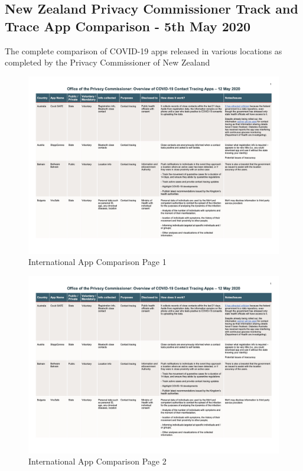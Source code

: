 \documentclass{scrreprt}
\begin{document}
\subsection{New Zealand Privacy Commissioner Track and Trace App Comparison - 5th May 2020}\label{nz-rep}
The complete comparison of COVID-19 apps released in various locations as completed by the Privacy Commissioner of New Zealand\\
\begin{figure}[H]
	\centering
	\includegraphics[page=1, width=0.9\linewidth]{2020-05-12-OPC-Comparison-of-COVID-19-Apps-colours}
	\caption{International App Comparison Page 1}
	\label{fig:1_2020-05-12-OPC-Comparison-of-COVID-19-Apps-colours}
\end{figure}

\begin{figure}[H]
	\centering
	\includegraphics[page=2, width=0.9\linewidth]{2020-05-12-OPC-Comparison-of-COVID-19-Apps-colours}
	\caption{International App Comparison Page 2}
	\label{fig:2_2020-05-12-OPC-Comparison-of-COVID-19-Apps-colours}
\end{figure}
\end{document}
